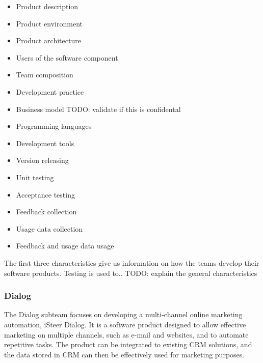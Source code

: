 \documentclass[english]{tktltiki2}
\theoremstyle{definition}
\theoremstyle{remark}
\begin{document}
\begin{multicols}{2}
\begin{itemize}
  \item Product description
  \item Product environment
  \item Product architecture
  \item Users of the software component
  \item Team composition
  \item Development practice
  \item Business model TODO: validate if this is confidental
  \item Programming languages
  \item Development tools
  \item Version releasing
  \item Unit testing
  \item Acceptance testing
  \item Feedback collection
  \item Usage data collection
  \item Feedback and usage data usage
\end{itemize}
\end{multicols}

The first three characteristics give us information on how the teams develop their software products. Testing is used to.. TODO: explain the general characteristics

\subsubsection{Dialog}
The Dialog subteam focuses on developing a multi-channel online marketing automation, iSteer Dialog. It is a software product designed to allow effective marketing on multiple channels, such as e-mail and websites, and to automate repetitive tasks. The product can be integrated to existing CRM solutions, and the data stored in CRM can then be effectively used for marketing purposes. 
\end{document}
